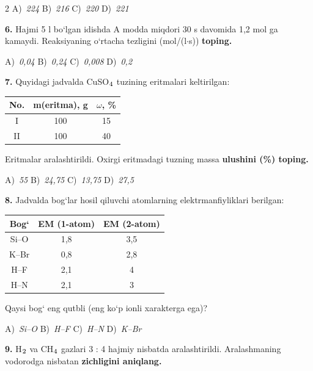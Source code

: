 \documentclass[11pt,a4paper]{article}
\renewcommand{\textsubscript}[1]{\ensuremath{_{\text{\fontsize{8}{8}\selectfont #1}}}}
\begin{document}
\begin{multicols}{2}
\noindent A)~\textsl{224} \hfill B)~\textsl{216} \hfill C)~\textsl{220} \hfill D)~\textsl{221}\par
\vspace{4pt}
\noindent\textbf{6.} Hajmi 5 l bo`lgan idishda A modda miqdori 30 s davomida 1,2 mol ga kamaydi. Reaksiyaning o`rtacha tezligini (mol/(l$\cdot$s)) \textbf{toping.}

\noindent A)~\textsl{0,04} \hfill B)~\textsl{0,24} \hfill C)~\textsl{0,008} \hfill D)~\textsl{0,2}\par
\vspace{4pt}
\noindent\textbf{7.} Quyidagi jadvalda CuSO\textsubscript{4} tuzining eritmalari keltirilgan:
\begin{center}
\renewcommand{\arraystretch}{1.15}
\begin{tabular}{|c|c|c|}\hline
\textbf{No.} & \textbf{m(eritma), g} & \textbf{$\omega$, \%} \\ \hline
I & 100 & 15 \\ \hline
II & 100 & 40 \\ \hline
\end{tabular}
\end{center}
Eritmalar aralashtirildi. Oxirgi eritmadagi tuzning massa \textbf{ulushini (\%) toping.}

\noindent A)~\textsl{55} \hfill B)~\textsl{24,75} \hfill C)~\textsl{13,75} \hfill D)~\textsl{27,5}\par
\vspace{4pt}
\noindent\textbf{8.} Jadvalda bog`lar hosil qiluvchi atomlarning elektrmanfiyliklari berilgan:
\begin{center}
\renewcommand{\arraystretch}{1.15}
\begin{tabular}{|c|c|c|}\hline
\textbf{Bog`} & \textbf{EM (1-atom)} & \textbf{EM (2-atom)} \\ \hline
Si--O & 1,8 & 3,5 \\ \hline
K--Br & 0,8 & 2,8 \\ \hline
H--F & 2,1 & 4 \\ \hline
H--N & 2,1 & 3 \\ \hline
\end{tabular}
\end{center}
Qaysi bog` eng qutbli (eng ko`p ionli xarakterga ega)?

\noindent A)~\textsl{Si--O} \hfill B)~\textsl{H--F} \hfill C)~\textsl{H--N} \hfill D)~\textsl{K--Br}\par
\vspace{4pt}
\noindent\textbf{9.} H\textsubscript{2} va CH\textsubscript{4} gazlari 3 : 4 hajmiy nisbatda aralashtirildi. Aralashmaning vodorodga nisbatan \textbf{zichligini aniqlang.}


\end{multicols}
\end{document}
